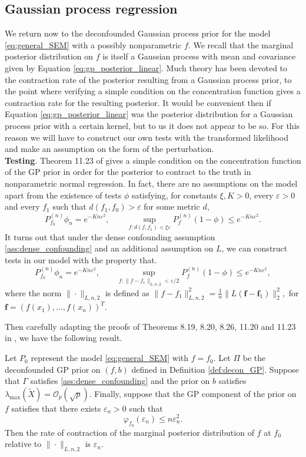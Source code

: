 \documentclass[11pt]{article}
\newcommand{\subparspace}{\vspace{3mm} \\}
\newcommand{\eps}{\varepsilon}
\newcommand{\cO}{\mathcal{O}}
\newcommand{\LX}{\tilde{X}}
\begin{document}
\subsection{Gaussian process regression}
We return now to the deconfounded Gaussian process prior for the model \eqref{eq:general_SEM} with a possibly nonparametric $f$. We recall that the marginal posterior distribution on $f$ is itself a Gaussian process with mean and covariance given by Equation \eqref{eq:gp_posterior_linear}. Much theory has been devoted to the contraction rate of the posterior resulting from a Gaussian process prior, to the point where verifying a simple condition on the concentration function gives a contraction rate for the resulting posterior.
It would be convenient then if Equation \eqref{eq:gp_posterior_linear} was the posterior distribution for a Gaussian process prior with a certain kernel, but to us it does not appear to be so. For this reason we will have to construct our own tests with the transformed likelihood and make an assumption on the form of the perturbation.
\subparspace
{\textbf{Testing}. } Theorem 11.23 of \cite{FNBI} gives a simple condition on the concentration function of the GP prior in order for the posterior to contract to the truth in nonparametric normal regression. In fact, there are no assumptions on the model apart from the existence of tests $\phi$ satisfying, for constants $\xi, K > 0$, every $\eps > 0$ and every $f_1$ such that $d(f_1, f_0) > \eps$ for some metric $d$,
\begin{equation*}
	P_{f_0}^{(n)} \phi_n = e^{-Kn\eps^2}, \qquad \sup_{f : d(f, f_1) < \xi \eps} P_f^{(n)} (1-\phi) \leq e^{-Kn\eps^2}.
\end{equation*}
It turns out that under the dense confounding assumption \eqref{ass:dense_confounding} and an additional assumption on $L$, we can construct tests in our model with the property that.
\begin{equation*}
	P_{f_0}^{(n)} \phi_n = e^{-Kn\eps^2}, \qquad \sup_{f : \|f - f_1\|_{L,n,2} < \eps/2} P_{f}^{(n)} (1-\phi) \leq e^{-Kn\eps^2},
\end{equation*}
where the norm $\|\cdot\|_{L, n, 2}$ is defined as
$
\|f - f_1\|^2_{L,n,2} = \frac{1}{n}\|L(\mathbf{f} - \mathbf{f}_1)\|_2^2,
$
for $\mathbf{f} = (f(x_1), \dots, f(x_n))^T$.

Then carefully adapting the proofs of Theorems 8.19, 8.20, 8.26, 11.20 and 11.23 in \cite{FNBI}, we have the following result.
\begin{theorem}\label{thm:gp_contraction}
	Let $P_0$ represent the model \eqref{eq:general_SEM} with $f = f_0$. Let $\Pi$ be the deconfounded GP prior on $(f, b)$ defined in Definition \ref{def:decon_GP}.
Suppose that  $\Gamma$ satisfies \eqref{ass:dense_confounding} and the prior on $b$ satisfies $\lambda_{\max}(\LX) = \cO_p(\sqrt{p})$.  Finally, suppose that the GP component of the prior on $f$ satisfies that there exists $\eps_n >0$ such that
	$$
	\varphi_{f_0}(\eps_n) \leq n\eps_n^2. 
	$$
	Then the rate of contraction of the marginal posterior distribution of $f$ at $f_0$ relative to $\| \cdot\|_{L,n,2}$ is $\eps_n$. 
	 \end{theorem}
\end{document}
